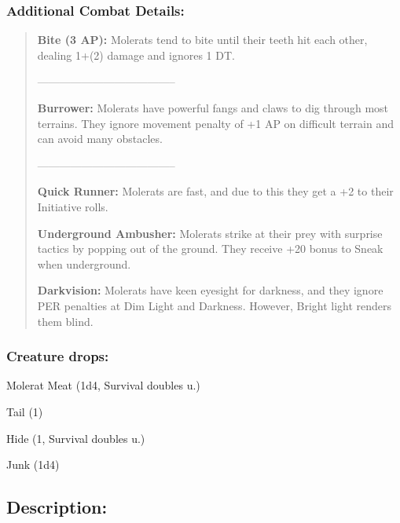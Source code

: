 \documentclass[11pt,a4paper,twocolumn]{book}
\begin{document}
	\subsubsection*{Additional Combat Details:}
	\begin{verse}
		\textbf{Bite (3 AP):} Molerats tend to bite until their teeth hit each other, dealing 1+(2) damage and ignores 1 DT.
		
		--------------------------------------	
		
		\textbf{Burrower:} Molerats have powerful fangs and claws to dig through most terrains. They ignore movement penalty of +1 AP on difficult terrain and can avoid many obstacles.
		
		--------------------------------------
		
		\textbf{Quick Runner:} Molerats are fast, and due to this they get a +2 to their Initiative rolls.
		
		\textbf{Underground Ambusher:} Molerats strike at their prey with surprise tactics by popping out of the ground. They receive +20 bonus to Sneak when underground.
		
		\textbf{Darkvision:} Molerats have keen eyesight for darkness, and they ignore PER penalties at Dim Light and Darkness. However, Bright light renders them blind.
		
%		
	\end{verse}
	
	\subsubsection*{Creature drops:}
	\begin{compactitem}
		\item Molerat Meat (1d4, Survival doubles u.)
		\item Tail (1)
		\item Hide (1, Survival doubles u.)
		\item Junk (1d4)
	\end{compactitem}
	
	\subsection*{Description:}
	
\end{document}
